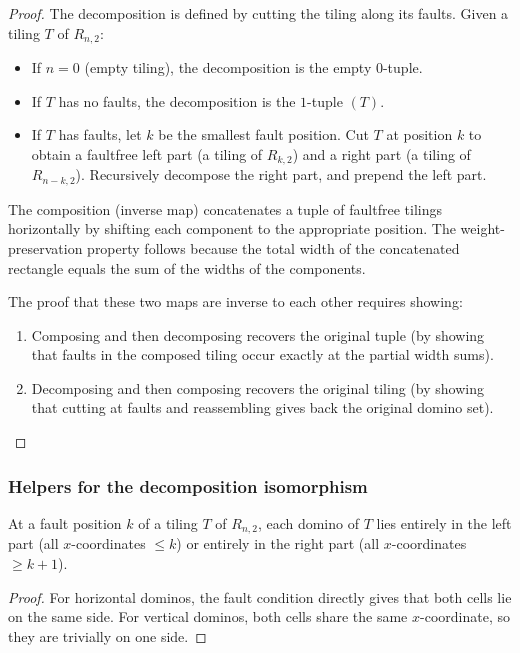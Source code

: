 \begin{proof}
The decomposition is defined by cutting the tiling along its faults.
Given a tiling $T$ of $R_{n,2}$:
\begin{itemize}
\item If $n = 0$ (empty tiling), the decomposition is the empty $0$-tuple.
\item If $T$ has no faults, the decomposition is the $1$-tuple $(T)$.
\item If $T$ has faults, let $k$ be the smallest fault position. Cut $T$ at position $k$
to obtain a faultfree left part (a tiling of $R_{k,2}$) and a right part (a tiling of $R_{n-k,2}$).
Recursively decompose the right part, and prepend the left part.
\end{itemize}

The composition (inverse map) concatenates a tuple of faultfree tilings
horizontally by shifting each component to the appropriate position. The
weight-preservation property follows because the total width of the
concatenated rectangle equals the sum of the widths of the components.

The proof that these two maps are inverse to each other requires showing:
\begin{enumerate}
\item Composing and then decomposing recovers the original tuple (by showing
that faults in the composed tiling occur exactly at the partial width sums).
\item Decomposing and then composing recovers the original tiling (by showing
that cutting at faults and reassembling gives back the original domino set).
\end{enumerate}
\end{proof}

\subsubsection{Helpers for the decomposition isomorphism}

\begin{lemma}
\label{lem.gf-ws.domino-left-or-right}
\leanhelper
\leanok
At a fault position $k$ of a tiling $T$ of $R_{n,2}$, each domino of $T$ lies
entirely in the left part (all $x$-coordinates $\le k$) or entirely in the
right part (all $x$-coordinates $\ge k+1$).
\end{lemma}

\begin{proof}
\leanok
For horizontal dominos, the fault condition directly gives that both cells
lie on the same side. For vertical dominos, both cells share the same
$x$-coordinate, so they are trivially on one side.
\end{proof}

